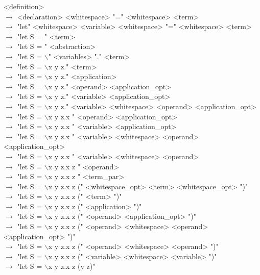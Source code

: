 \documentclass[12pt]{article}
\begin{document}
<definition> \\
$\rightarrow$ <declaration> <whitespace> "=" <whitespace> <term> \\
$\rightarrow$ "let" <whitespace> <variable> <whitespace> "=" <whitespace> <term> \\
$\rightarrow$ "let S = " <term> \\
$\rightarrow$ "let S = " <abstraction> \\
$\rightarrow$ "let S = $\backslash$" <variables> "." <term> \\
$\rightarrow$ "let S = $\backslash$x y z." <term> \\
$\rightarrow$ "let S = $\backslash$x y z." <application> \\
$\rightarrow$ "let S = $\backslash$x y z." <operand> <application\_opt> \\
$\rightarrow$ "let S = $\backslash$x y z." <variable> <application\_opt> \\
$\rightarrow$ "let S = $\backslash$x y z." <variable> <whitespace> <operand> <application\_opt> \\
$\rightarrow$ "let S = $\backslash$x y z.x " <operand> <application\_opt> \\
$\rightarrow$ "let S = $\backslash$x y z.x " <variable> <application\_opt> \\
$\rightarrow$ "let S = $\backslash$x y z.x " <variable> <whitespace> <operand> <application\_opt> \\
$\rightarrow$ "let S = $\backslash$x y z.x " <variable> <whitespace> <operand> \\
$\rightarrow$ "let S = $\backslash$x y z.x z " <operand> \\
$\rightarrow$ "let S = $\backslash$x y z.x z " <term\_par> \\
$\rightarrow$ "let S = $\backslash$x y z.x z (" <whitespace\_opt> <term> <whitespace\_opt> ")" \\
$\rightarrow$ "let S = $\backslash$x y z.x z (" <term> ")" \\
$\rightarrow$ "let S = $\backslash$x y z.x z (" <application> ")" \\
$\rightarrow$ "let S = $\backslash$x y z.x z (" <operand> <application\_opt> ")" \\
$\rightarrow$ "let S = $\backslash$x y z.x z (" <operand> <whitespace> <operand> <application\_opt> ")" \\
$\rightarrow$ "let S = $\backslash$x y z.x z (" <operand> <whitespace> <operand> ")" \\
$\rightarrow$ "let S = $\backslash$x y z.x z (" <variable> <whitespace> <variable> ")" \\
$\rightarrow$ "let S = $\backslash$x y z.x z (y z)" \\
\end{document}
